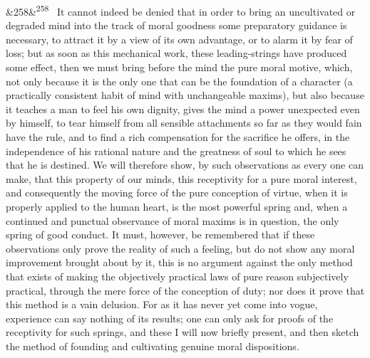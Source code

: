 \documentclass[12pt]{article}
\newcommand{\para}[1][]{\par\noindent\ifx&#1&\else\textsuperscript{\footnotesize #1}~\fi}
\begin{document}
\para[258] It cannot indeed be denied that in order to bring an uncultivated or degraded mind into the track of moral goodness some preparatory guidance is necessary, to attract it by a view of its own advantage, or to alarm it by fear of loss; but as soon as this mechanical work, these leading-strings have produced some effect, then we must bring before the mind the pure moral motive, which, not only because it is the only one that can be the foundation of a character (a practically consistent habit of mind with unchangeable maxims), but also because it teaches a man to feel his own dignity, gives the mind a power unexpected even by himself, to tear himself from all sensible attachments so far as they would fain have the rule, and to find a rich compensation for the sacrifice he offers, in the independence of his rational nature and the greatness of soul to which he sees that he is destined. We will therefore show, by such observations as every one can make, that this property of our minds, this receptivity for a pure moral interest, and consequently the moving force of the pure conception of virtue, when it is properly applied to the human heart, is the most powerful spring and, when a continued and punctual observance of moral maxims is in question, the only spring of good conduct. It must, however, be remembered that if these observations only prove the reality of such a feeling, but do not show any moral improvement brought about by it, this is no argument against the only method that exists of making the objectively practical laws of pure reason subjectively practical, through the mere force of the conception of duty; nor does it prove that this method is a vain delusion. For as it has never yet come into vogue, experience can say nothing of its results; one can only ask for proofs of the receptivity for such springs, and these I will now briefly present, and then sketch the method of founding and cultivating genuine moral dispositions.
\end{document}
